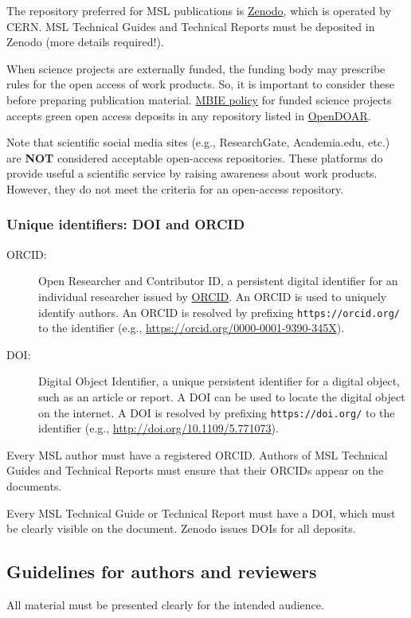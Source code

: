 {The repository preferred for MSL publications is \href{https://zenodo.org/}{Zenodo}, which is operated by CERN. MSL Technical Guides and Technical Reports must be deposited in Zenodo (more details required!).  

When science projects are externally funded, the funding body may prescribe rules for the open access of work products. So, it is important to consider these before preparing publication material.
\href{https://www.mbie.govt.nz/science-and-technology/science-and-innovation/agencies-policies-and-budget-initiatives/open-research-policy/}{MBIE policy} for funded science projects accepts green open access deposits in any repository listed in \href{https://v2.sherpa.ac.uk/opendoar/}{OpenDOAR}.

Note that scientific social media sites (e.g., ResearchGate, Academia.edu, etc.) are \textbf{NOT} considered acceptable open-access repositories. These platforms do provide useful a scientific service by raising awareness about work products. However, they do not meet the criteria for an open-access repository.     

\subsubsection{Unique identifiers: DOI and ORCID}
\begin{description}
    \item[ORCID: ] Open Researcher and Contributor ID, a persistent digital identifier for an individual researcher issued by \href{http://orcid.org/}{ORCID}. An ORCID is used to uniquely identify authors. An ORCID is resolved by prefixing \texttt{https://orcid.org/} to the identifier (e.g., \url{https://orcid.org/0000-0001-9390-345X}). 
    \item[DOI: ] Digital Object Identifier, a unique persistent identifier for a digital object, such as an article or report. A DOI can be used to locate the digital object on the internet. A DOI is resolved by prefixing \texttt{https://doi.org/} to the identifier (e.g., \url{http://doi.org/10.1109/5.771073}). 
\end{description}

Every MSL author must have a registered ORCID. Authors of MSL Technical Guides and Technical Reports must ensure that their ORCIDs appear on the documents.

Every MSL Technical Guide or Technical Report must have a DOI, which must be clearly visible on the document. Zenodo issues DOIs for all deposits.
}
\subsection{Guidelines for authors and reviewers}
All material must be presented clearly for the intended audience.

